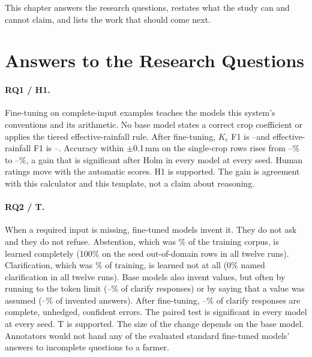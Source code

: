 This chapter answers the research questions, restates what the study can and cannot claim, and lists the work that should come next.

\section{Answers to the Research Questions}
\label{sec:answers}

\paragraph{RQ1 / H1.}
Fine-tuning on complete-input examples teaches the models this system's conventions and its arithmetic. No base model states a correct crop coefficient or applies the tiered effective-rainfall rule. After fine-tuning, $K_c$ F1 is \RangeFTKcFoneMin--\RangeFTKcFoneMax and effective-rainfall F1 is \RangeFTRainFoneMin--\RangeFTRainFoneMax. Accuracy within $\pm$0.1\,mm on the \NumericSingle single-crop rows rises from \RangeZSExactPtOneMin--\RangeZSExactPtOneMax\% to \RangeFTExactPtOneMin--\RangeFTExactPtOneMax\%, a gain that is significant after Holm in every model at every seed. Human ratings move with the automatic scores. H1 is supported. The gain is agreement with this calculator and this template, not a claim about reasoning.

\paragraph{RQ2 / T.}
When a required input is missing, fine-tuned models invent it. They do not ask and they do not refuse. Abstention, which was \TrainPctAbstain\% of the training corpus, is learned completely (100\% on the \TestAbstain seed out-of-domain rows in all twelve runs). Clarification, which was \TrainPctClarify\% of training, is learned not at all (0\% named clarification in all twelve runs). Base models also invent values, but often by running to the token limit (\RangeZSTruncRateMin--\RangeZSTruncRateMax\% of clarify responses) or by saying that a value was assumed (\RangeZSExplicitAmongInvMinInt--\RangeZSExplicitAmongInvMaxInt\% of invented answers). After fine-tuning, \RangeFTSeedAConfErrBMin--\RangeFTSeedAConfErrBMax\% of clarify responses are complete, unhedged, confident errors. The paired test is significant in every model at every seed. T is supported. The size of the change depends on the base model. Annotators would not hand any of the evaluated standard fine-tuned models' answers to incomplete questions to a farmer.

